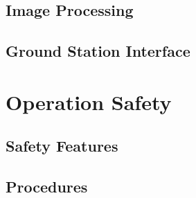 \documentclass[10pt]{report}
\begin{document}
\subsection{Image Processing}

\subsection{Ground Station Interface}

\section{Operation Safety}

\subsection{Safety Features}

\subsection{Procedures}



\end{document}
